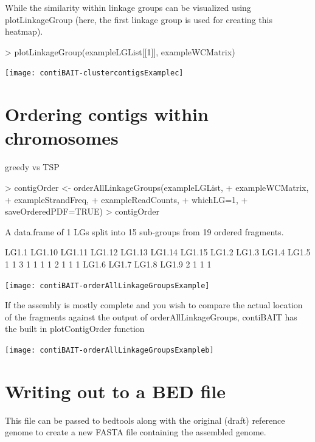 \documentclass{article}
\begin{document}
While the similarity within linkage groups can be visualized using plotLinkageGroup (here, the first linkage group is used for creating this heatmap).

\begin{Schunk}
\begin{Sinput}
> plotLinkageGroup(exampleLGList[[1]], exampleWCMatrix)
\end{Sinput}
\end{Schunk}
\texttt{[image: contiBAIT-clustercontigsExamplec]}


\section{Ordering contigs within chromosomes}

greedy vs TSP

\begin{Schunk}
\begin{Sinput}
> contigOrder <- orderAllLinkageGroups(exampleLGList,
+ exampleWCMatrix,
+ exampleStrandFreq,
+ exampleReadCounts,
+ whichLG=1,
+ saveOrderedPDF=TRUE)
> contigOrder
\end{Sinput}
\begin{Soutput}
A data.frame of 1 LGs split into 15 sub-groups from 19 ordered fragments.

 LG1.1 LG1.10 LG1.11 LG1.12 LG1.13 LG1.14 LG1.15  LG1.2  LG1.3  LG1.4  LG1.5 
     1      1      3      1      1      1      1      2      1      1      1 
 LG1.6  LG1.7  LG1.8  LG1.9 
     2      1      1      1 
\end{Soutput}
\end{Schunk}
\texttt{[image: contiBAIT-orderAllLinkageGroupsExample]}

If the assembly is mostly complete and you wish to compare the actual location of the fragments against the output of orderAllLinkageGroups, contiBAIT has the built in plotContigOrder function 

\begin{Schunk}
\end{Schunk}
\texttt{[image: contiBAIT-orderAllLinkageGroupsExampleb]}


\section{Writing out to a BED file}
This file can be passed to bedtools along with the original (draft) reference genome to create a new FASTA file containing the assembled genome.
\end{document}
